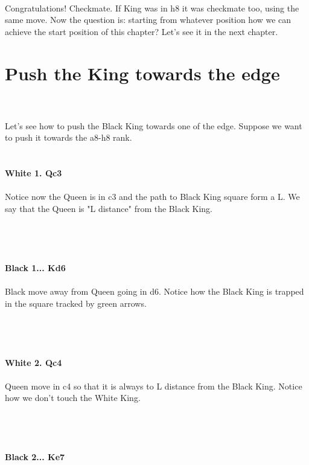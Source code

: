 \documentclass{article}
\begin{document}
\\
Congratulations! Checkmate. If King was in h8 it was checkmate too, using the same move. Now the question is: starting from whatever position how we can achieve the start position of this chapter? Let's see it in the next chapter.\section{ Push the King towards the edge}

\\
\\
Let's see how to push the Black King towards one of the edge. Suppose we want to push it towards the a8-h8 rank.\\

\\
\\
\textbf{White 1. Qc3}\\
\\
Notice now the Queen is in c3 and the path to Black King square form a L. We say that the Queen is "L distance" from the Black King.\\\\
\\

\\
\\
\textbf{Black 1... Kd6}\\
\\
Black move away from Queen going in d6. Notice how the Black King is trapped in the square tracked by green arrows.\\\\
\\

\\
\\
\textbf{White 2. Qc4}\\
\\
Queen move in c4 so that it is always to L distance from the Black King. Notice how we don't touch the White King.\\\\
\\

\\
\\
\textbf{Black 2... Ke7}\\
\\
\end{document}
